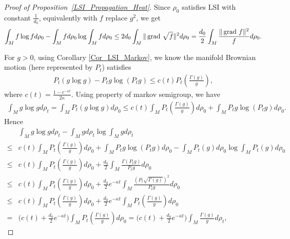 \begin{proof}[Proof of Proposition~\ref{LSI_Propagation_Heat}]
    Since $\rho_{0}$ satisfies LSI with constant $\frac{1}{d_{0}}$, 
    equivalently with $f$ replace $g^{2}$, we get 
    \begin{align*}
        \int_{M} f \log f d\rho_{0} - \int_{M} f d\rho_{0} \log \int_{M} f d\rho_{0} 
        \le 2 d_{0} \int_{M} \|\operatorname{grad\,} \sqrt{f}\|^{2} d\rho_{0}
        = \frac{d_{0}}{2} \int_{M} \frac{\|\operatorname{grad\,} f \|^{2}}{f} d\rho_{0}.
    \end{align*}

    For $g > 0$, using Corollary \ref{Cor_LSI_Markov}, 
    we know the manifold Brownian motion (here represented by $P_{t}$) satisfies 
    \begin{align*}
         P_{t}(g \log g) -  P_{t} g \log (P_{t} g) 
            \le c(t) P_{t} (\frac{\Gamma(g)}{g}),
    \end{align*}
    where $c(t) = \frac{1 - e^{-\kappa t}}{2\kappa}$.
    Using property of markov semigroup, we have 
    \begin{align*}
        \int_{M} g \log g d\rho_{t} = \int_{M} P_{t}(g \log g) d\rho_{0}  
            \le c(t) \int_{M} P_{t} (\frac{\Gamma(g)}{g}) d\rho_{0}
            + \int_{M} P_{t} g \log (P_{t} g) d\rho_{0}.
    \end{align*}
    Hence
    \begin{align*}
            &\int_{M} g \log g d\rho_{t} - \int_{M} g d\rho_{t} \log \int_{M} g d\rho_{t} \\
            \le & c(t) \int_{M} P_{t} (\frac{\Gamma(g)}{g}) d\rho_{0}
            + \int_{M} P_{t} g \log (P_{t} g) d\rho_{0}
            - \int_{M} P_{t}(g) d\rho_{0} \log \int_{M} P_{t}(g) d\rho_{0} \\
            \le & c(t) \int_{M} P_{t} (\frac{\Gamma(g)}{g}) d\rho_{0}
            + \frac{d_{0}}{2}\int_{M} \frac{\Gamma(P_{t} g)}{P_{t} g} d\rho_{0} \\
            \le & c(t) \int_{M} P_{t} (\frac{\Gamma(g)}{g}) d\rho_{0}
            + \frac{d_{0}}{2}e^{-\kappa t}\int_{M} \frac{(P_{t}\sqrt{\Gamma(g)})^{2}}{P_{t} g} d\rho_{0} \\
            \le & c(t) \int_{M} P_{t} (\frac{\Gamma(g)}{g}) d\rho_{0}
            + \frac{d_{0}}{2}e^{-\kappa t}\int_{M} P_{t}(\frac{\Gamma(g)}{g}) d\rho_{0} \\
            = & \Big(c(t) + \frac{d_{0}}{2}e^{-\kappa t}\Big) \int_{M} P_{t}(\frac{\Gamma(g)}{g}) d\rho_{0}
            = \Big(c(t) + \frac{d_{0}}{2}e^{-\kappa t}\Big) \int_{M} \frac{\Gamma(g)}{g} d\rho_{t},

\end{align*}
\end{proof}
